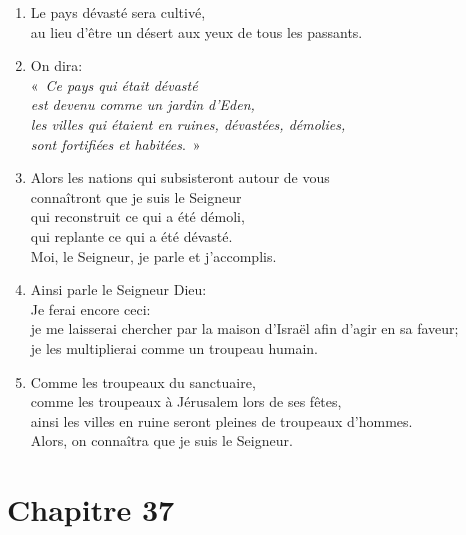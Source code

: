 \begin{enumerate}[leftmargin=\psleftmargin, labelsep = \pslabelsep, label={\arabic*}, font=\color{\pscolor}\small\textsuperscript, parsep=0em, itemsep=0em, topsep=0em ]
    \item Le pays dévasté sera cultivé, \\ au lieu d’être un désert aux yeux de tous les passants.
    \item On dira: \\ \decalage «~\textit{Ce pays qui était dévasté \\ \decalage est devenu comme un jardin d’Eden, \\\decalage les villes qui étaient en ruines, dévastées, démolies, \\ \decalage sont fortifiées et habitées}.~»
    \item Alors les nations qui subsisteront autour de vous \\ connaîtront que je suis le Seigneur \\ qui reconstruit ce qui a été démoli, \\ qui replante ce qui a été dévasté. \\ Moi, le Seigneur, je parle et j’accomplis. \parSpace
    \item  Ainsi parle le Seigneur Dieu: \\ Je ferai encore ceci: \\ je me laisserai chercher par la maison d’Israël afin d’agir en sa faveur; \\ je les multiplierai comme un troupeau humain.
    \item Comme les troupeaux du sanctuaire, \\ comme les troupeaux à Jérusalem lors de ses fêtes, \\ ainsi les villes en ruine seront pleines de troupeaux d’hommes. \\ Alors, on connaîtra que je suis le Seigneur.
\end{enumerate}
\newpage

\section*{Chapitre 37}
